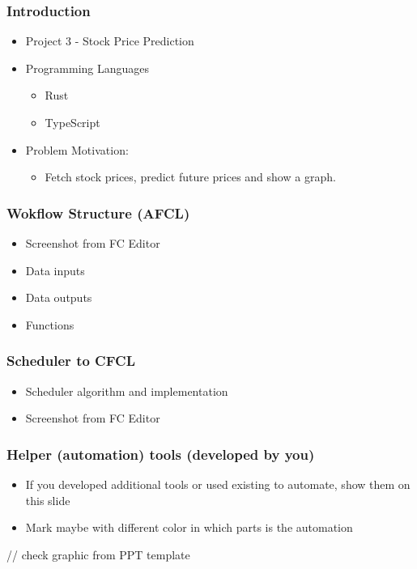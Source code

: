 \documentclass[11pt,t,usepdftitle=false,aspectratio=169]{beamer}
\begin{document}
\begin{frame}
\frametitle{Introduction}
  \begin{itemize}
    \item Project 3 - Stock Price Prediction
    \item Programming Languages
      \begin{itemize}
        \item Rust
        \item TypeScript
      \end{itemize}
    \item Problem Motivation:
      \begin{itemize}
        \item Fetch stock prices, predict future prices and show a graph.
      \end{itemize}
  \end{itemize}
\end{frame}

\begin{frame}
\frametitle{Wokflow Structure (AFCL)}
    \begin{itemize}
        \item Screenshot from FC Editor
        \item Data inputs
        \item Data outputs
        \item Functions
    \end{itemize}
\end{frame}

\begin{frame}
\frametitle{Scheduler to CFCL}
    \begin{itemize}
        \item Scheduler algorithm and implementation
        \item Screenshot from FC Editor
    \end{itemize}
\end{frame}

\begin{frame}
\frametitle{Helper (automation) tools (developed by you)}
    \begin{itemize}
        \item If you developed additional tools or used existing to automate, show them on this slide
        \item Mark maybe with different color in which parts is the automation
    \end{itemize}
    \vspace{1cm}
    // check graphic from PPT template
\end{frame}
\end{document}
